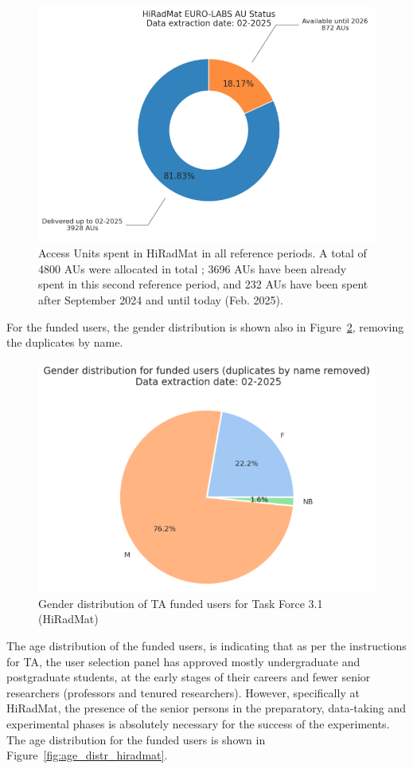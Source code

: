 \begin{figure}[!h]
    \centering
    \includegraphics[width=0.75\linewidth]{graphics/stat_pie_hiradmat.png}
    \caption{Access Units spent in HiRadMat in all reference periods. A total of 4800 AUs were allocated in total ; 3696 AUs have been already spent in this second reference period, and 232 AUs have been spent after September 2024 and until today (Feb. 2025). }
    \label{fig:stat_pie_hiradmat}
\end{figure}

For the funded users, the gender distribution is shown also in Figure~\ref{fig:gender_distr_hiradmat}, removing the duplicates by name. 

\begin{figure}[!h]
    \centering
    \includegraphics[width=0.6\linewidth]{graphics/gender_distr_hiradmat.png}
    \caption{Gender distribution of TA funded users for Task Force 3.1 (HiRadMat)}
    \label{fig:gender_distr_hiradmat}
\end{figure}

The age distribution of the funded users, is indicating that as per the instructions for TA, the user selection panel has approved mostly undergraduate and postgraduate students, at the early stages of their careers and fewer senior researchers (professors and tenured researchers). However, specifically at HiRadMat, the presence of the senior persons in the preparatory, data-taking and experimental phases is absolutely necessary for the success of the experiments. The age distribution for the funded users is shown in Figure~\ref{fig:age_distr_hiradmat}.


